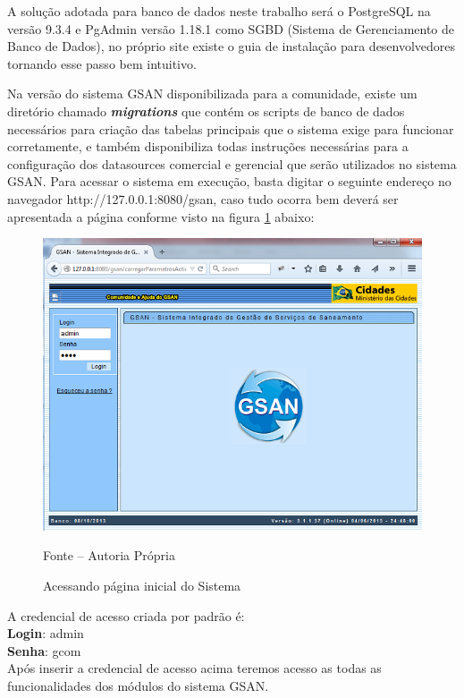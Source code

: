 A solução adotada para banco de dados neste trabalho será o PostgreSQL na versão 9.3.4 e PgAdmin versão 1.18.1 como SGBD (Sistema de Gerenciamento de Banco de Dados), no próprio site existe o guia de instalação para desenvolvedores tornando esse passo bem intuitivo.

Na versão do sistema GSAN disponibilizada para a comunidade, existe um diretório chamado \textbf{\textit{migrations}} que contém os scripts de banco de dados necessários para criação das tabelas principais que o sistema exige para funcionar corretamente, e também disponibiliza todas instruções necessárias para a configuração dos datasources comercial e gerencial que serão utilizados no sistema GSAN.
Para acessar o sistema em execução, basta digitar o seguinte endereço no navegador http://127.0.0.1:8080/gsan, caso tudo ocorra bem deverá ser apresentada a página conforme visto na figura \ref{figura:acessoPaginaInicial} abaixo:

\begin{figure}[!htb]
	\centering
	\includegraphics{figuras/gsan_online.png}
	\caption{Acessando página inicial do Sistema}
	\label{figura:acessoPaginaInicial}	
	Fonte – Autoria Própria
\end{figure}


A credencial de acesso criada por padrão é: \\
\textbf{Login}: admin \\
\textbf{Senha}: gcom \\
Após inserir a credencial de acesso acima teremos acesso as todas as funcionalidades dos módulos do sistema GSAN.

